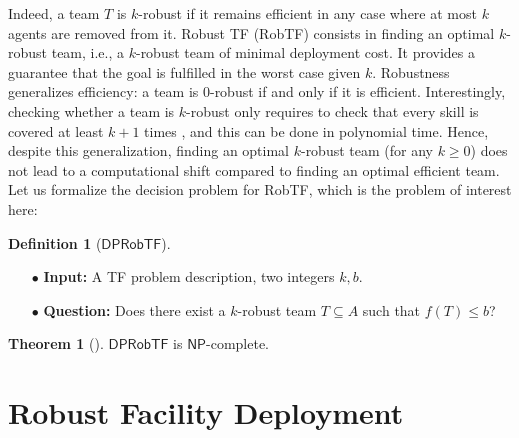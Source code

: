 \documentclass[conference]{IEEEtran}
\newcommand{\dprobtf}{\ensuremath{\mathsf{DPRobTF}}}
\theoremstyle{definition}
\newtheorem{definition}{Definition}
\newtheorem{theorem}{Theorem}
\begin{document}
Indeed, a team $T$ is $k$-robust if it remains efficient in any
case where at most $k$ agents are removed from it.
Robust TF (RobTF) consists in finding an optimal $k$-robust team, i.e., a
$k$-robust team of minimal deployment cost. It provides a
guarantee that the goal is fulfilled in the worst case given $k$.
Robustness generalizes efficiency: a team is $0$-robust if and only if it is efficient.
Interestingly,
checking whether a team is $k$-robust only requires to
check that every skill is covered at least $k + 1$ times \cite{Okimoto2015}, and this can be done in polynomial time.
Hence, despite this generalization, finding an optimal $k$-robust team (for any $k \geq 0$) does not lead to a computational shift
compared to finding an optimal efficient team. Let us formalize the decision problem for RobTF, which is the problem of interest here:
\begin{definition}[\dprobtf]\hfill
	\begin{itemize}
		\item[$\bullet$] \textbf{Input:} A TF problem description, two integers $k, b$.
		\item[$\bullet$] \textbf{Question:} Does there exist a $k$-robust team $T \subseteq A$ such that $f(T) \leq b$?
	\end{itemize}
	\label{def:decision problem}
\end{definition}

\begin{theorem}[\cite{Okimoto2015}]
	\dprobtf{} is $\mathsf{NP}$-complete.
	\label{prop:TORTF}
\end{theorem}


\section{Robust Facility Deployment}
\end{document}
